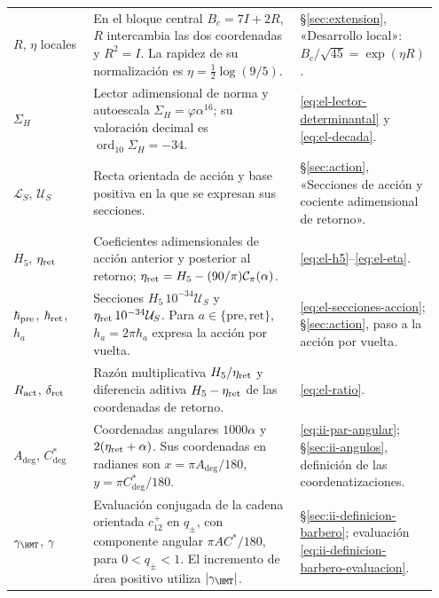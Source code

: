\begin{longtable}{@{}>{\raggedright\arraybackslash}p{0.19\linewidth}
                    >{\raggedright\arraybackslash}p{0.49\linewidth}
                    >{\raggedright\arraybackslash}p{0.27\linewidth}@{}}
\(R\), \(\eta\) locales
& En el bloque central \(B_c=7I+2R\), \(R\) intercambia las dos
  coordenadas y \(R^2=I\). La rapidez de su normalización es
  \(\eta=\tfrac12\log(9/5)\).
& \S\ref{sec:extension}, «Desarrollo local»:
  \(B_c/\sqrt{45}=\exp(\eta R)\).\\[3pt]

\(\Sigma_H\)
& Lector adimensional de norma y autoescala
  \(\Sigma_H=\varphi\alpha^{16}\); su valoración decimal es
  \(\operatorname{ord}_{10}\Sigma_H=-34\).
& \eqref{eq:el-lector-determinantal} y \eqref{eq:el-decada}.\\[3pt]

\pagebreak[4]

\(\mathcal L_S\), \(\mathcal U_S\)
& Recta orientada de acción y base positiva en la que se expresan
  sus secciones.
& \S\ref{sec:action}, «Secciones de acción y cociente adimensional
  de retorno».\\[3pt]

\(H_5\), \(\eta_{\rm ret}\)
& Coeficientes adimensionales de acción anterior y posterior al retorno;
  \(\eta_{\rm ret}=H_5-(90/\pi)\mathcal C_\pi(\alpha)\).
& \eqref{eq:el-h5}--\eqref{eq:el-eta}.\\[3pt]

\(\hbar_{\rm pre}\), \(\hbar_{\rm ret}\), \(h_a\)
& Secciones \(H_5\,10^{-34}\mathcal U_S\) y
  \(\eta_{\rm ret}\,10^{-34}\mathcal U_S\).
  Para \(a\in\{\mathrm{pre},\mathrm{ret}\}\),
  \(h_a=2\pi\hbar_a\) expresa la acción por vuelta.
& \eqref{eq:el-secciones-accion};
  \S\ref{sec:action}, paso a la acción por vuelta.\\[3pt]

\(R_{\rm act}\), \(\delta_{\rm ret}\)
& Razón multiplicativa \(H_5/\eta_{\rm ret}\) y diferencia
  aditiva \(H_5-\eta_{\rm ret}\) de las coordenadas de retorno.
& \eqref{eq:el-ratio}.\\[3pt]

\(A_{\deg}\), \(C^*_{\deg}\)
& Coordenadas angulares \(1000\alpha\) y
  \(2(\eta_{\rm ret}+\alpha)\). Sus coordenadas en radianes son
  \(x=\pi A_{\deg}/180\), \(y=\pi C^*_{\deg}/180\).
& \eqref{eq:ii-par-angular};
  \S\ref{sec:ii-angulos}, definición de las coordenatizaciones.\\[3pt]

\(\gamma_{\HMT}\), \(\gamma\)
& Evaluación conjugada de la cadena orientada \(c_{12}^{+}\) en
  \(q_\pm\), con componente angular \(\pi AC^*/180\), para
  \(0<q_\pm<1\). El incremento de área positivo utiliza
  \(|\gamma_{\HMT}|\).
& \S\ref{sec:ii-definicion-barbero};
  evaluación \eqref{eq:ii-definicion-barbero-evaluacion}.\\[3pt]


\end{longtable}
